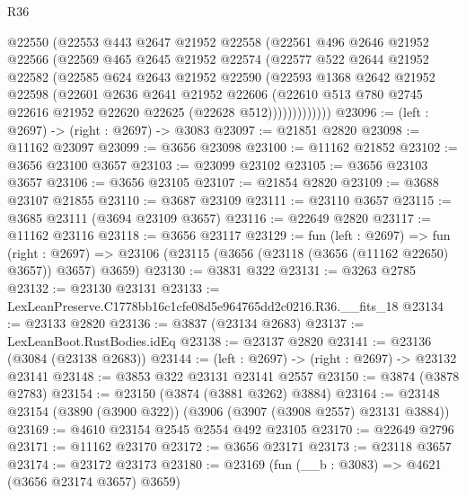 \begin{lexlean}{R36}
\begin{coremodule}
            @22550
            (@22553
              @443
              @2647
              @21952
              @22558
              (@22561
                @496
                @2646
                @21952
                @22566
                (@22569
                  @465
                  @2645
                  @21952
                  @22574
                  (@22577
                    @522
                    @2644
                    @21952
                    @22582
                    (@22585
                      @624
                      @2643
                      @21952
                      @22590
                      (@22593
                        @1368
                        @2642
                        @21952
                        @22598
                        (@22601
                          @2636
                          @2641
                          @21952
                          @22606
                          (@22610
                            @513
                            @780
                            @2745
                            @22616
                            @21952
                            @22620
                            @22625
                            (@22628 @512)))))))))))))
@23096 := (left : @2697) -> (right : @2697) -> @3083
@23097 := @21851 @2820
@23098 := @11162 @23097
@23099 := @3656 @23098
@23100 := @11162 @21852
@23102 := @3656 @23100 @3657
@23103 := @23099 @23102
@23105 := @3656 @23103 @3657
@23106 := @3656 @23105
@23107 := @21854 @2820
@23109 := @3688 @23107 @21855
@23110 := @3687 @23109
@23111 := @23110 @3657
@23115 := @3685 @23111 (@3694 @23109 @3657)
@23116 := @22649 @2820
@23117 := @11162 @23116
@23118 := @3656 @23117
@23129 := fun (left : @2697) =>
  fun (right : @2697) => @23106 (@23115 (@3656 (@23118 (@3656 (@11162 @22650) @3657)) @3657) @3659)
@23130 := @3831 @322
@23131 := @3263 @2785
@23132 := @23130 @23131
@23133 := LexLeanPreserve.C1778bb16c1cfe08d5e964765dd2c0216.R36.__fits_18
@23134 := @23133 @2820
@23136 := @3837 (@23134 @2683)
@23137 := LexLeanBoot.RustBodies.idEq
@23138 := @23137 @2820
@23141 := @23136 (@3084 (@23138 @2683))
@23144 := (left : @2697) -> (right : @2697) -> @23132 @23141
@23148 := @3853 @322 @23131 @23141 @2557
@23150 := @3874 (@3878 @2783)
@23154 := @23150 (@3874 (@3881 @3262) @3884)
@23164 := @23148 @23154 (@3890 (@3900 @322)) (@3906 (@3907 (@3908 @2557) @23131 @3884))
@23169 := @4610 @23154 @2545 @2554 @492 @23105
@23170 := @22649 @2796
@23171 := @11162 @23170
@23172 := @3656 @23171
@23173 := @23118 @3657
@23174 := @23172 @23173
@23180 := @23169 (fun (__b : @3083) => @4621 (@3656 @23174 @3657) @3659)

\end{coremodule}
\end{lexlean}

